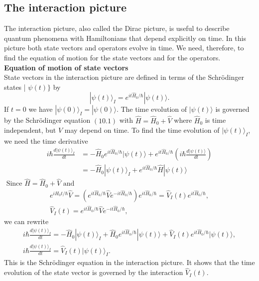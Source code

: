 \subsection{The interaction picture}
The interaction picture, also called the Dirac picture, is useful to describe quantum phenomena with Hamiltonians that depend explicitly on time. In this picture both state vectors and operators evolve in time. We need, therefore, to find the equation of motion for the state vectors and for the operators.\\
\textbf{Equation of motion of state vectors}\\
State vectors in the interaction picture are defined in terms of the Schrödinger states | $\psi(t)\}$ by
$$
|\psi(t)\rangle_{I}=e^{i t \hat{H}_{0} / \hbar}|\psi(t)\rangle .
$$
If $t=0$ we have $|\psi(0)\rangle_{I}=|\psi(0)\rangle$. The time evolution of $|\psi(t)\rangle$ is governed by the Schrödinger equation $(10.1)$ with $\hat{H}=\hat{H}_{0}+\hat{V}$ where $\hat{H}_{0}$ is time independent, but $\hat{V}$ may depend on time.
To find the time evolution of $|\psi(t)\rangle_{I}$, we need the time derivative 
$$
\begin{aligned}
i \hbar \frac{d|\psi(t)\rangle_{I}}{d t} &=-\hat{H}_{0} e^{i t \hat{H}_{0} / \hbar}|\psi(t)\rangle+e^{i t \hat{H}_{0} / \hbar}\left(i \hbar \frac{d|\psi(t)\rangle}{d t}\right) \\
&=-\hat{H}_{0}|\psi(t)\rangle_{I}+e^{i t \hat{H}_{0} / \hbar} \hat{H}|\psi(t)\rangle
\end{aligned}
$$
$\text { Since } \hat{H}=\hat{H}_{0}+\hat{V} \text { and }$
$$\begin{gathered}
e^{i H_{0} t / \hbar} \hat{V}=\left(e^{i t \hat{H}_{0} / \hbar} \hat{V} e^{-i t \hat{H}_{0} / \hbar}\right) e^{i t \hat{H}_{0} / \hbar}=\hat{V}_{I}(t) e^{i t \hat{H}_{0} / \hbar}, \\
\hat{V}_{I}(t)=e^{i t \hat{H}_{0} / \hbar} \hat{V} e^{-i t \hat{H}_{0} / \hbar},
\end{gathered}$$
we can rewrite\\
$$\begin{gathered}
i \hbar \frac{d|\psi(t)\rangle_{I}}{d t}=-\hat{H}_{0}|\psi(t)\rangle_{I}+\hat{H}_{0} e^{i t \hat{H}_{0} / \hbar}|\psi(t)\rangle+\hat{V}_{I}(t) e^{i t \hat{H}_{0} / \hbar}|\psi(t)\rangle, \\
i \hbar \frac{d|\psi(t)\rangle_{I}}{d t}=\hat{V}_{I}(t)|\psi(t)\rangle_{I} .
\end{gathered}$$
This is the Schrödinger equation in the interaction picture. It shows that the time evolution of the state vector is governed by the interaction $\hat{V}_{I}(t)$.\\
